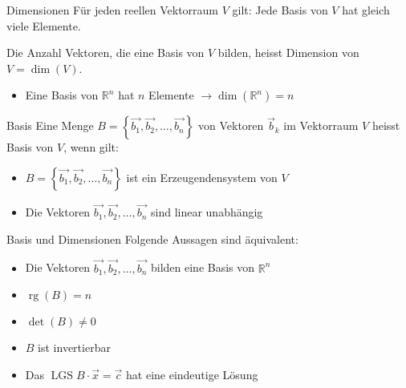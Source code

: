 \begin{definition}{Dimensionen}
    Für jeden reellen Vektorraum $V$ gilt: Jede Basis von $V$ hat gleich viele Elemente.

    Die Anzahl Vektoren, die eine Basis von $V$ bilden, heisst Dimension von $V=\operatorname{dim}(V)$.

    \begin{itemize}
    \item Eine Basis von $\mathbb{R}^{n}$ hat $n$ Elemente $\rightarrow \operatorname{dim}\left(\mathbb{R}^{n}\right)=n$
    \end{itemize}
\end{definition}

\begin{definition}{Basis}
    Eine Menge $B=\left\{\overrightarrow{b_{1}}, \overrightarrow{b_{2}}, \ldots, \overrightarrow{b_{n}}\right\}$ von Vektoren $\vec{b}_{k}$ im Vektorraum $V$ heisst Basis von $V$,
    wenn gilt:
    \begin{itemize}
        \item $B=\left\{\overrightarrow{b_{1}}, \overrightarrow{b_{2}}, \ldots, \overrightarrow{b_{n}}\right\}$ ist ein Erzeugendensystem von $V$
        \item Die Vektoren $\overrightarrow{b_{1}}, \overrightarrow{b_{2}}, \ldots, \overrightarrow{b_{n}}$ sind linear unabhängig
    \end{itemize}
\end{definition}

\begin{theorem}{Basis und Dimensionen}
    Folgende Aussagen sind äquivalent:
    \begin{itemize}
    \item Die Vektoren $\overrightarrow{b_{1}}, \overrightarrow{b_{2}}, \ldots, \overrightarrow{b_{n}}$ bilden eine Basis von $\mathbb{R}^{n}$
    \item $\operatorname{rg}(B)=n$
    \item $\operatorname{det}(B) \neq 0$
    \item $B$ ist invertierbar
    \item Das $\operatorname{LGS} B \cdot \vec{x}=\vec{c}$ hat eine eindeutige Lösung
    \end{itemize}
\end{theorem}

